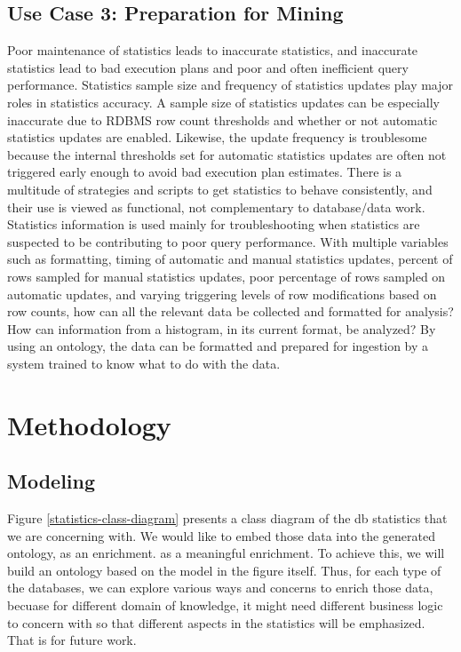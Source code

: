 \documentclass[sigconf]{acmart}
\begin{document}
\subsection{Use Case 3: Preparation for Mining}
Poor maintenance of statistics leads to inaccurate statistics, and inaccurate statistics lead to bad execution plans and poor and often inefficient query performance. Statistics sample size and frequency of statistics updates play major roles in statistics accuracy. A sample size of statistics updates can be especially inaccurate due to RDBMS row count thresholds and whether or not automatic statistics updates are enabled. Likewise, the update frequency is troublesome because the internal thresholds set for automatic statistics updates are often not triggered early enough to avoid bad execution plan estimates. There is a multitude of strategies and scripts to get statistics to behave consistently, and their use is viewed as functional, not complementary to database/data work. Statistics information is used mainly for troubleshooting when statistics are suspected to be contributing to poor query performance. With multiple variables such as formatting, timing of automatic and manual statistics updates, percent of rows sampled for manual statistics updates, poor percentage of rows sampled on automatic updates, and varying triggering levels of row modifications based on row counts, how can all the relevant data be collected and formatted for analysis? How can information from a histogram, in its current format, be analyzed? By using an ontology, the data can be formatted and prepared for ingestion by a system trained to know what to do with the data.

\section{Methodology}

\subsection{Modeling}
Figure \ref{statistics-class-diagram} presents a class diagram of the db statistics that we are concerning with. We would like to embed those data into the generated ontology, as an enrichment. as a meaningful enrichment. To achieve this, we will build an ontology based on the model in the figure itself. Thus, for each type of the databases, we can explore various ways and concerns to enrich those data, becuase for different domain of knowledge, it might need different business logic to concern with so that different aspects in the statistics will be emphasized. That is for future work.
\end{document}
